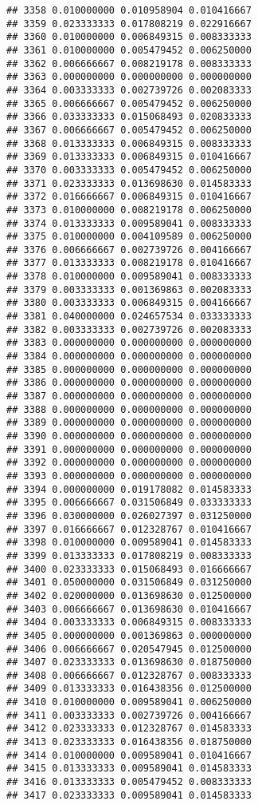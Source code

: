 \documentclass[
]{article}
\begin{document}
\begin{verbatim}
## 3358 0.010000000 0.010958904 0.010416667
## 3359 0.023333333 0.017808219 0.022916667
## 3360 0.010000000 0.006849315 0.008333333
## 3361 0.010000000 0.005479452 0.006250000
## 3362 0.006666667 0.008219178 0.008333333
## 3363 0.000000000 0.000000000 0.000000000
## 3364 0.003333333 0.002739726 0.002083333
## 3365 0.006666667 0.005479452 0.006250000
## 3366 0.033333333 0.015068493 0.020833333
## 3367 0.006666667 0.005479452 0.006250000
## 3368 0.013333333 0.006849315 0.008333333
## 3369 0.013333333 0.006849315 0.010416667
## 3370 0.003333333 0.005479452 0.006250000
## 3371 0.023333333 0.013698630 0.014583333
## 3372 0.016666667 0.006849315 0.010416667
## 3373 0.010000000 0.008219178 0.006250000
## 3374 0.013333333 0.009589041 0.008333333
## 3375 0.010000000 0.004109589 0.006250000
## 3376 0.006666667 0.002739726 0.004166667
## 3377 0.013333333 0.008219178 0.010416667
## 3378 0.010000000 0.009589041 0.008333333
## 3379 0.003333333 0.001369863 0.002083333
## 3380 0.003333333 0.006849315 0.004166667
## 3381 0.040000000 0.024657534 0.033333333
## 3382 0.003333333 0.002739726 0.002083333
## 3383 0.000000000 0.000000000 0.000000000
## 3384 0.000000000 0.000000000 0.000000000
## 3385 0.000000000 0.000000000 0.000000000
## 3386 0.000000000 0.000000000 0.000000000
## 3387 0.000000000 0.000000000 0.000000000
## 3388 0.000000000 0.000000000 0.000000000
## 3389 0.000000000 0.000000000 0.000000000
## 3390 0.000000000 0.000000000 0.000000000
## 3391 0.000000000 0.000000000 0.000000000
## 3392 0.000000000 0.000000000 0.000000000
## 3393 0.000000000 0.000000000 0.000000000
## 3394 0.000000000 0.019178082 0.014583333
## 3395 0.006666667 0.031506849 0.033333333
## 3396 0.030000000 0.026027397 0.031250000
## 3397 0.016666667 0.012328767 0.010416667
## 3398 0.010000000 0.009589041 0.014583333
## 3399 0.013333333 0.017808219 0.008333333
## 3400 0.023333333 0.015068493 0.016666667
## 3401 0.050000000 0.031506849 0.031250000
## 3402 0.020000000 0.013698630 0.012500000
## 3403 0.006666667 0.013698630 0.010416667
## 3404 0.003333333 0.006849315 0.008333333
## 3405 0.000000000 0.001369863 0.000000000
## 3406 0.006666667 0.020547945 0.012500000
## 3407 0.023333333 0.013698630 0.018750000
## 3408 0.006666667 0.012328767 0.008333333
## 3409 0.013333333 0.016438356 0.012500000
## 3410 0.010000000 0.009589041 0.006250000
## 3411 0.003333333 0.002739726 0.004166667
## 3412 0.023333333 0.012328767 0.014583333
## 3413 0.023333333 0.016438356 0.018750000
## 3414 0.010000000 0.009589041 0.010416667
## 3415 0.013333333 0.009589041 0.014583333
## 3416 0.013333333 0.005479452 0.008333333
## 3417 0.023333333 0.009589041 0.014583333

\end{verbatim}
\end{document}
